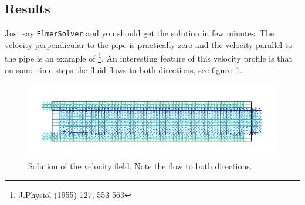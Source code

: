\subsection*{Results}
Just say {\tt ElmerSolver} and you should get the solution in few minutes.
The velocity perpendicular to the pipe is practically zero and the velocity
parallel to the pipe is an example of 
\footnote{J.Physiol (1955) 127, 553-563}.
An interesting feature of this velocity profile is that on some time steps 
the fluid flows to both directions, see figure~\ref{f:womersley}.
\begin{figure}[!hb]
\begin{center}
\includegraphics[width=\textwidth]{womersley}
\caption{Solution of the velocity field. Note the flow to both directions.}
\label{f:womersley}
\end{center}
\end{figure}

